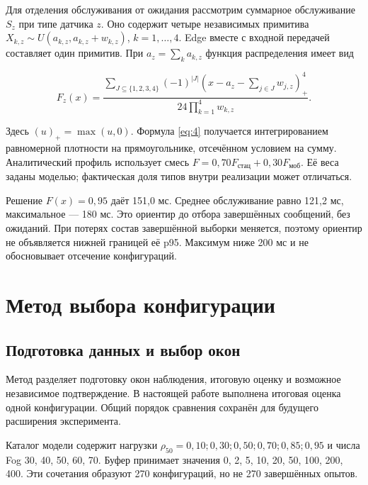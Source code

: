 Для отделения обслуживания от ожидания рассмотрим суммарное обслуживание \(S_z\) при типе датчика \(z\). Оно содержит четыре независимых примитива \(X_{k,z}\sim U(a_{k,z},a_{k,z}+w_{k,z})\), \(k=1,\ldots,4\). Edge вместе с входной передачей составляет один примитив. При \(a_z=\sum_k a_{k,z}\) функция распределения имеет вид

\begin{equation}\label{eq:4}
F_z(x)=\frac{\displaystyle\sum_{J\subseteq\{1,2,3,4\}}(-1)^{|J|}
\left(x-a_z-\sum_{j\in J}w_{j,z}\right)_+^4}
{24\displaystyle\prod_{k=1}^{4}w_{k,z}}.
\end{equation}

Здесь \((u)_+=\max(u,0)\). Формула \eqref{eq:4} получается интегрированием равномерной плотности на прямоугольнике, отсечённом условием на сумму. Аналитический профиль использует смесь \(F=0{,}70F_{\text{стац}}+0{,}30F_{\text{моб}}\). Её веса заданы моделью; фактическая доля типов внутри реализации может отличаться.

Решение \(F(x)=0{,}95\) даёт 151,0 мс. Среднее обслуживание равно 121,2 мс, максимальное --- 180 мс. Это ориентир до отбора завершённых сообщений, без ожиданий. При потерях состав завершённой выборки меняется, поэтому ориентир не объявляется нижней границей её p95. Максимум ниже 200 мс и не обосновывает отсечение конфигураций.

\hypertarget{ux43cux435ux442ux43eux434-ux432ux44bux431ux43eux440ux430-ux43aux43eux43dux444ux438ux433ux443ux440ux430ux446ux438ux438}{%
\FloatBarrier
\section{Метод выбора конфигурации}}

\hypertarget{ux43fux43eux434ux433ux43eux442ux43eux432ux43aux430-ux434ux430ux43dux43dux44bux445-ux438-ux432ux44bux431ux43eux440-ux43eux43aux43eux43d}{%
\subsection{Подготовка данных и выбор окон}}

Метод разделяет подготовку окон наблюдения, итоговую оценку и возможное независимое подтверждение. В настоящей работе выполнена итоговая оценка одной конфигурации. Общий порядок сравнения сохранён для будущего расширения эксперимента.

Каталог модели содержит нагрузки \(\rho_{50}=0{,}10;\allowbreak 0{,}30;\allowbreak 0{,}50;\allowbreak 0{,}70;\allowbreak 0{,}85;\allowbreak 0{,}95\) и числа Fog 30, 40, 50, 60, 70. Буфер принимает значения 0, 2, 5, 10, 20, 50, 100, 200, 400. Эти сочетания образуют 270 конфигураций, но не 270 завершённых опытов.

